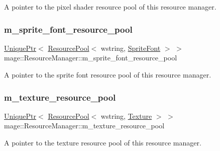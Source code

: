 A pointer to the pixel shader resource pool of this resource manager. \hypertarget{classmage_1_1_resource_manager_a49369b160a75dee96cdebd2b957ae0c4}{}\label{classmage_1_1_resource_manager_a49369b160a75dee96cdebd2b957ae0c4} 
\subsubsection{\texorpdfstring{m\+\_\+sprite\+\_\+font\+\_\+resource\+\_\+pool}{m\_sprite\_font\_resource\_pool}}
{\footnotesize\ttfamily \hyperlink{namespacemage_a3316d7143a973e37adf1110f2e80ca31}{Unique\+Ptr}$<$ \hyperlink{classmage_1_1_resource_pool}{Resource\+Pool}$<$ wstring, \hyperlink{classmage_1_1_sprite_font}{Sprite\+Font} $>$ $>$ mage\+::\+Resource\+Manager\+::m\+\_\+sprite\+\_\+font\+\_\+resource\+\_\+pool\hspace{0.3cm}{\ttfamily [private]}}

A pointer to the sprite font resource pool of this resource manager. \hypertarget{classmage_1_1_resource_manager_aba76c2267b30ccae61c160497e8d8efc}{}\label{classmage_1_1_resource_manager_aba76c2267b30ccae61c160497e8d8efc} 
\subsubsection{\texorpdfstring{m\+\_\+texture\+\_\+resource\+\_\+pool}{m\_texture\_resource\_pool}}
{\footnotesize\ttfamily \hyperlink{namespacemage_a3316d7143a973e37adf1110f2e80ca31}{Unique\+Ptr}$<$ \hyperlink{classmage_1_1_resource_pool}{Resource\+Pool}$<$ wstring, \hyperlink{classmage_1_1_texture}{Texture} $>$ $>$ mage\+::\+Resource\+Manager\+::m\+\_\+texture\+\_\+resource\+\_\+pool\hspace{0.3cm}{\ttfamily [private]}}

A pointer to the texture resource pool of this resource manager. \hypertarget{classmage_1_1_resource_manager_adc36ebb3e2d04fddc3a23e2f1303dbfe}{}\label{classmage_1_1_resource_manager_adc36ebb3e2d04fddc3a23e2f1303dbfe} 
